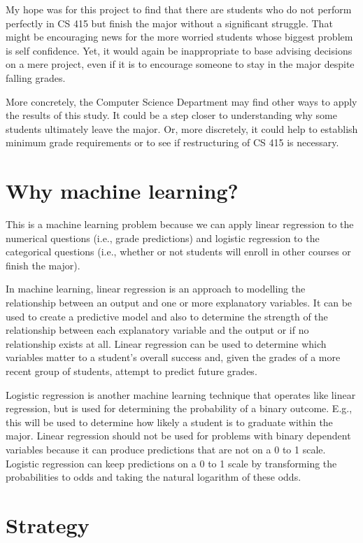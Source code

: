 \documentclass[letterpaper,11pt]{article}
\begin{document}
My hope was for this project to find that there are students who do not perform perfectly in CS 415 but finish the major without a significant struggle.  That might be encouraging news for the more worried students whose biggest problem is self confidence.  Yet, it would again be inappropriate to base advising decisions on a mere project, even if it is to encourage someone to stay in the major despite falling grades.

More concretely, the Computer Science Department may find other ways to apply the results of this study.  It could be a step closer to understanding why some students ultimately leave the major.  Or, more discretely, it could help to establish minimum grade requirements or to see if restructuring of CS 415 is necessary.

\section{Why machine learning?}

This is a machine learning problem because we can apply linear regression to the numerical questions (i.e., grade predictions) and logistic regression to the categorical questions (i.e., whether or not students will enroll in other courses or finish the major).

In machine learning, linear regression is an approach to modelling the relationship between an output and one or more explanatory variables.  It can be used to create a predictive model and also to determine the strength of the relationship between each explanatory variable and the output or if no relationship exists at all.  Linear regression can be used to determine which variables matter to a student's overall success and, given the grades of a more recent group of students, attempt to predict future grades.

Logistic regression is another machine learning technique that operates like linear regression, but is used for determining the probability of a binary outcome.  E.g., this will be used to determine how likely a student is to graduate within the major.  Linear regression should not be used for problems with binary dependent variables because it can produce predictions that are not on a 0 to 1 scale.  Logistic regression can keep predictions on a 0 to 1 scale by transforming the probabilities to odds and taking the natural logarithm of these odds.

\section{Strategy}
\end{document}
